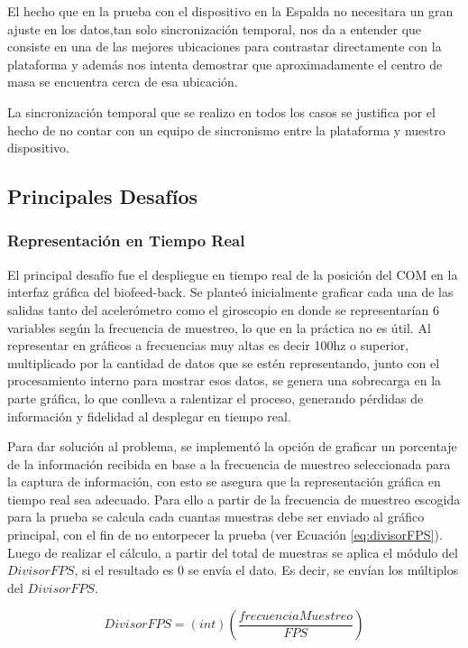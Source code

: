 \documentclass[12pt,a4paper]{article}
\begin{document}
El hecho que en la prueba con el dispositivo en la Espalda no necesitara un gran ajuste en los datos,tan solo sincronización temporal, nos da a entender que consiste en una de las mejores ubicaciones para contrastar directamente con la plataforma y además nos intenta demostrar que aproximadamente el centro de masa se encuentra cerca de esa ubicación.

La sincronización temporal que se realizo en todos los casos se justifica por el hecho de no contar con un equipo de sincronismo entre la plataforma y nuestro dispositivo.

\newpage
\subsection{Principales Desafíos}
\subsubsection{Representación en Tiempo Real}
El principal desafío fue el despliegue en tiempo real de la posición del COM en la interfaz gráfica del biofeed-back. Se planteó inicialmente graficar cada una de las salidas tanto del acelerómetro como el giroscopio en donde se representarían 6 variables según la frecuencia de muestreo, lo que en la práctica no es útil. Al representar en gráficos a frecuencias muy altas es decir 100hz o superior, multiplicado por la cantidad de datos que se estén representando, junto con el procesamiento interno para mostrar esos datos, se genera una sobrecarga en la parte gráfica, lo que conlleva a ralentizar el proceso, generando pérdidas de información y fidelidad al desplegar en tiempo real.

Para dar solución al problema, se implementó la opción de graficar un porcentaje de la información recibida en base a la frecuencia de muestreo seleccionada para la captura de información, con esto se asegura que la representación gráfica en tiempo real sea adecuado. Para ello a partir de la frecuencia de muestreo escogida para la prueba se calcula cada cuantas muestras debe ser enviado al gráfico principal, con el fin de no entorpecer la prueba (ver Ecuación \ref{eq:divisorFPS}). 
Luego de realizar el cálculo, a partir del total de muestras se aplica el módulo del $DivisorFPS$, si el resultado es 0 se envía el dato. Es decir, se envían los múltiplos del $DivisorFPS$.


\begin{equation}
\label{eq:divisorFPS}
DivisorFPS=(int)\left(\frac{frecuenciaMuestreo}{FPS}\right)
\end{equation}
\end{document}
